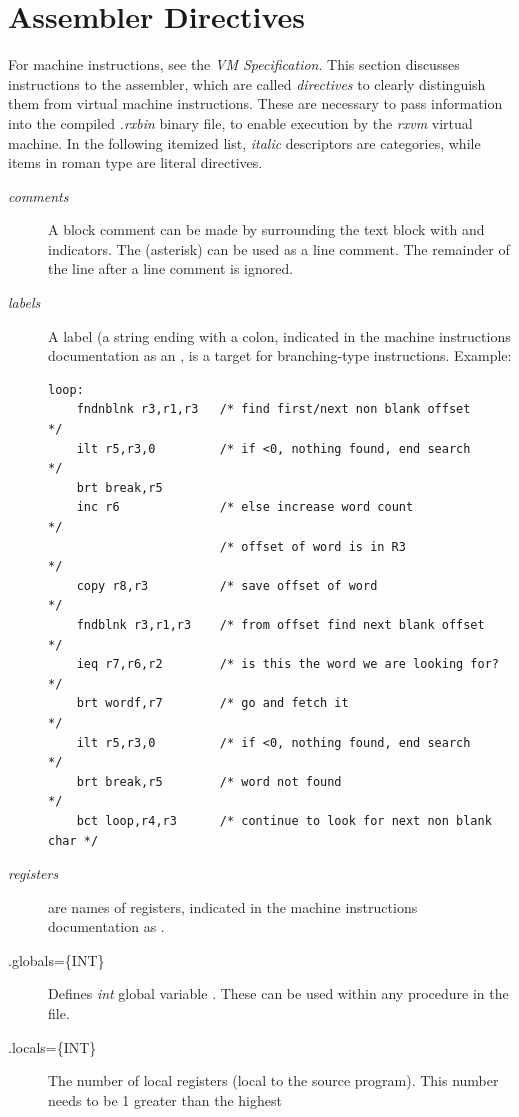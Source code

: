 \section{Assembler Directives}
For machine instructions, see the \emph{\crexx{} VM
  Specification}. This section discusses instructions to the
assembler, which are called \emph{directives} to clearly distinguish
them from virtual machine instructions. These are necessary to pass information into the compiled
\emph{.rxbin} binary file, to enable execution by the \emph{rxvm}
virtual machine. In the following itemized list, \emph{italic}
descriptors are categories, while items in roman type are literal directives.
\begin{description}
\item[\emph{comments}] A block comment can be made by
  surrounding the text block with \code{/*} and \code{*/}
  indicators. The \code{*} (asterisk) can be used as a line
  comment. The remainder of the line after a line comment is ignored.
\item[\emph{labels}] A label (a string ending with a colon, indicated in the machine
  instructions documentation as an , is a target for
  branching-type instructions.
  Example:
  \begin{lstlisting}[language=rxas]
loop:
    fndnblnk r3,r1,r3   /* find first/next non blank offset    */
    ilt r5,r3,0         /* if <0, nothing found, end search    */
    brt break,r5
    inc r6              /* else increase word count            */
                        /* offset of word is in R3             */
    copy r8,r3          /* save offset of word                 */
    fndblnk r3,r1,r3    /* from offset find next blank offset  */
    ieq r7,r6,r2        /* is this the word we are looking for?*/
    brt wordf,r7        /* go and fetch it                     */
    ilt r5,r3,0         /* if <0, nothing found, end search    */
    brt break,r5        /* word not found                      */
    bct loop,r4,r3      /* continue to look for next non blank char */
  \end{lstlisting}
\item[\emph{registers}]  are names of registers, indicated
  in the machine instructions documentation as .
\item[.globals=\{INT\}]Defines \emph{int} global variable . These can be used within any procedure in the file.
\item[.locals=\{INT\}] The number of local registers (local to the
  source program). This number needs to be 1 greater than the highest

\end{description}
